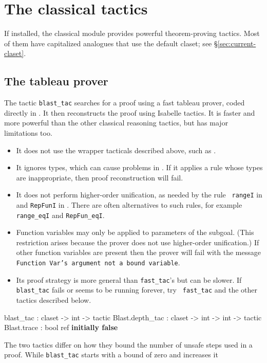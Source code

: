 \section{The classical tactics}
 If installed, the classical module provides
powerful theorem-proving tactics.  Most of them have capitalized analogues
that use the default claset; see \S\ref{sec:current-claset}.


\subsection{The tableau prover}
The tactic \texttt{blast_tac} searches for a proof using a fast tableau prover,
coded directly in \ML.  It then reconstructs the proof using Isabelle
tactics.  It is faster and more powerful than the other classical
reasoning tactics, but has major limitations too.
\begin{itemize}
\item It does not use the wrapper tacticals described above, such as
  .
\item It ignores types, which can cause problems in \HOL.  If it applies a rule
  whose types are inappropriate, then proof reconstruction will fail.
\item It does not perform higher-order unification, as needed by the rule {\tt
    rangeI} in {\HOL} and \texttt{RepFunI} in {\ZF}.  There are often
    alternatives to such rules, for example {\tt
    range_eqI} and \texttt{RepFun_eqI}.
\item Function variables may only be applied to parameters of the subgoal.
(This restriction arises because the prover does not use higher-order
unification.)  If other function variables are present then the prover will
fail with the message {\small\tt Function Var's argument not a bound variable}.
\item Its proof strategy is more general than \texttt{fast_tac}'s but can be
  slower.  If \texttt{blast_tac} fails or seems to be running forever, try {\tt
  fast_tac} and the other tactics described below.
\end{itemize}
%
\begin{ttbox} 
blast_tac        : claset -> int -> tactic
Blast.depth_tac  : claset -> int -> int -> tactic
Blast.trace      : bool ref \hfill{\bf initially false}
\end{ttbox}
The two tactics differ on how they bound the number of unsafe steps used in a
proof.  While \texttt{blast_tac} starts with a bound of zero and increases it
